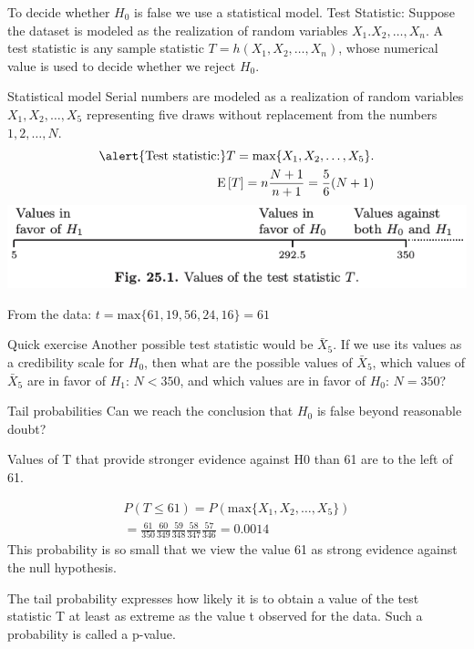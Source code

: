 \documentclass{beamer}
\newcommand{\E}[1]{\operatorname{E}\left[#1\right]}
\renewcommand{\P}[1]{P\left(#1\right)}
\begin{document}
\begin{frame}{To decide whether $H_0$ is false we use a statistical model.}
  \alert{Test Statistic}: Suppose the dataset is modeled as the realization of
  random variables $X_1.X_2,\ldots, X_n$. A test statistic is any sample
  statistic $T = h(X_1,X_2,\ldots,X_n)$, whose numerical value is used to
  decide whether we reject $H_0$.
\end{frame}

\begin{frame}{Statistical model}
  Serial numbers are modeled as a realization of random variables
  $X_1,X_2,\ldots, X_5$ representing five draws without replacement from the
  numbers $1,2,\ldots,N$.
  \begin{align*}
    \text{\alert{Test statistic:}}T = \text{max}\{X_1,X_2,\ldots,X_5\}.\\
    \E{T} = n\frac{N+1}{n+1} = \frac{5}{6}(N+1)
  \end{align*}
  \includegraphics[width=\linewidth]{test-statistic}

  From the data: $t=\text{max}\{61, 19, 56, 24, 16\} = 61$
\end{frame}

\begin{frame}[t]{Quick exercise}
  Another possible test statistic would be $\bar{X}_5$. If we use its values as
  a credibility scale for $H_0$, then what are the possible values of
  $\bar{X}_5$, which values of $\bar{X}_5$ are in favor of $H_1$: $N<350$, and
  which values are in favor of $H_0$: $N=350$?
\end{frame}

\begin{frame}{Tail probabilities}
  Can we reach the conclusion that $H_0$ is false beyond reasonable doubt?

  Values of T that provide stronger evidence against H0 than 61 are to the left
  of 61.

  \begin{align*}
    \P{T\leq 61} = \P{\text{max}\{ X_1,X_2,\ldots,X_5 \}}\\
    = \frac{61}{350}\frac{60}{349}\frac{59}{348}\frac{58}{347}\frac{57}{346}
    = 0.0014
  \end{align*}
  This probability is so small that we view the value 61 as strong evidence
  against the null hypothesis.

  \alert{The tail probability expresses how likely it is to obtain a value of
    the test statistic T at least as extreme as the value t observed for the
    data. Such a probability is called a p-value. }
\end{frame}
\end{document}
